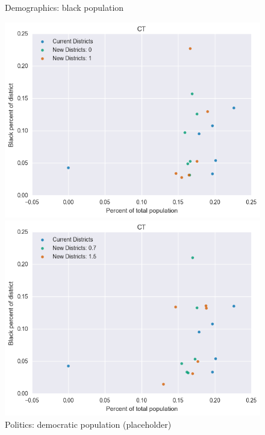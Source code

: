 \begin{figure}[htb!] \centering
\caption{ Demographics: black population }
\includegraphics[width=4.5in]{../analysis/CT/analysis_scatter.png}
\caption{ Politics: democratic population (placeholder)}
\includegraphics[width=4.5in]{../analysis/CT/analysis_scatter2.png}
\end{figure}

\clearpage
\newpage

